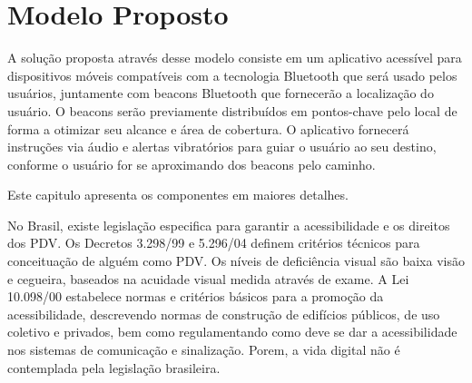 \documentclass[english,brazilian]{UNISINOSmonografia}
\begin{document}
\chapter{Modelo Proposto}

A solução proposta através desse modelo consiste em um aplicativo acessível para dispositivos móveis compatíveis com a tecnologia Bluetooth que será usado pelos usuários, juntamente com beacons Bluetooth que fornecerão a localização do usuário. O beacons serão previamente distribuídos em pontos-chave pelo local de forma a otimizar seu alcance e área de cobertura. O aplicativo fornecerá instruções via áudio e alertas vibratórios para guiar o usuário ao seu destino, conforme o usuário for se aproximando dos beacons pelo caminho.

Este capitulo apresenta os componentes em maiores detalhes.







No Brasil, existe legislação especifica para garantir a acessibilidade e os direitos dos PDV. Os Decretos 3.298/99 e 5.296/04 definem critérios técnicos para conceituação de alguém como PDV. Os níveis de deficiência visual são baixa visão e cegueira, baseados na acuidade visual medida através de exame. A Lei 10.098/00 estabelece normas e critérios básicos para a promoção da acessibilidade, descrevendo normas de construção de edifícios públicos, de uso coletivo e privados, bem como regulamentando como deve se dar a acessibilidade nos sistemas de comunicação e sinalização. Porem, a vida digital não é contemplada pela legislação brasileira.
\end{document}
